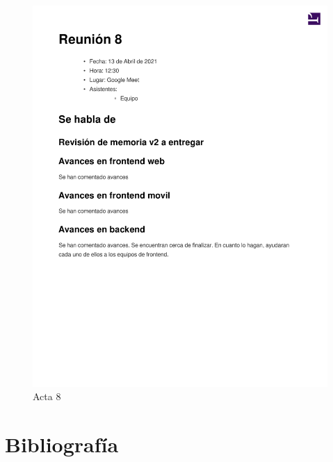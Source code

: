 \documentclass{article}
\begin{document}
\begin{figure}
   \includegraphics[width=.8\textwidth]{../../actas_reuniones/acta8.pdf}
   \caption{Acta 8}
\end{figure}
 
\section*{Bibliografía}
\end{document}
